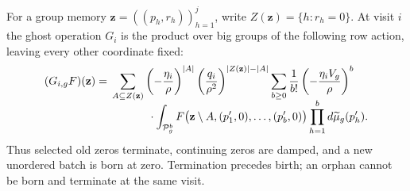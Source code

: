 For a group memory $\mathbf z=((p_h,r_h))_{h=1}^j$, write
$Z(\mathbf z)=\{h:r_h=0\}$.  At visit $i$ the ghost operation
$G_i$ is the product over big groups of the following row
action, leaving every other coordinate fixed:
\begin{align}
 (G_{i,g}F)(\mathbf z)
 ={}&\sum_{A\subseteq Z(\mathbf z)}
 \left(-\frac{\eta_i}{\rho}\right)^{|A|}
 \left(\frac{q_i}{\rho^2}\right)^{|Z(\mathbf z)|-|A|}
 \sum_{b\ge0}\frac1{b!}
 \left(-\frac{\eta_iV_g}{\rho}\right)^b\notag\\[-2mm]
 &\hspace{12mm}\cdot
 \int_{\mathcal P_g^b}
 F\big(\mathbf z\setminus A,(p'_1,0),\ldots,(p'_b,0)\big)
                 \prod_{h=1}^b d\widetilde\mu_g(p'_h).
 \label{eq:ghost-row}
\end{align}
Thus selected old zeros terminate, continuing zeros are damped,
and a new unordered batch is born at zero.  Termination precedes
birth; an orphan cannot be born and terminate at the same visit.

